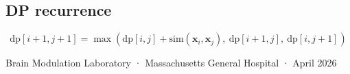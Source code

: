 \documentclass[11pt, a4paper]{article}
\begin{document}
\subsection*{DP recurrence}
\[ \text{dp}[i{+}1,j{+}1] = \max\!\left(\text{dp}[i,j]+\text{sim}(\mathbf{x}_i,\mathbf{x}_j),\ \text{dp}[i{+}1,j],\ \text{dp}[i,j{+}1]\right) \]

\vfill
\begin{center}
{\small\color{gray}
Brain Modulation Laboratory · Massachusetts General Hospital · April 2026}
\end{center}
\end{document}

